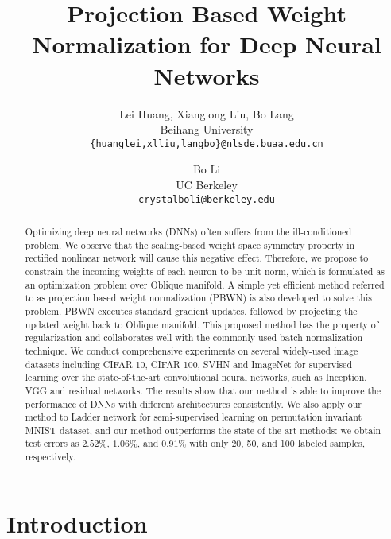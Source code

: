 \documentclass[twocolumn]{article}
\newcommand{\TODO}[1]{\textcolor{red}{TODO: }\textcolor{red}{\emph{#1}}}
\begin{document}
\title{Projection Based Weight Normalization for Deep Neural Networks}

\author{
Lei Huang, Xianglong Liu, Bo Lang\\
Beihang University\\
\texttt{\small\{huanglei,xlliu,langbo\}@nlsde.buaa.edu.cn} \\
\and
Bo Li \\
UC Berkeley\\
\texttt{\small crystalboli@berkeley.edu}
}
\date{}
\maketitle
\begin{abstract}
Optimizing deep neural networks (DNNs) often suffers from  the ill-conditioned problem. We observe that the scaling-based weight space symmetry property in  rectified nonlinear network will cause this negative effect. Therefore, we propose to constrain the incoming weights of each neuron to be unit-norm, which is formulated as an optimization problem over Oblique manifold. A simple yet efficient method referred to as projection based weight normalization (PBWN) is also developed to solve this problem. PBWN executes standard gradient updates, followed by projecting the updated weight back to Oblique manifold.
This proposed method has the property of regularization and collaborates well with the commonly used batch normalization technique.
We conduct comprehensive experiments on several widely-used image datasets including CIFAR-10, CIFAR-100, SVHN and ImageNet for supervised learning over the state-of-the-art convolutional neural networks, such as  Inception, VGG  and residual networks. The results show that our method is able to improve the performance of DNNs with different architectures consistently. We also apply our method to Ladder network for  semi-supervised learning on permutation invariant MNIST dataset, and our method outperforms the state-of-the-art methods: we obtain test errors as $2.52\%$, $1.06\%$, and $0.91\%$ with only 20, 50, and 100 labeled samples, respectively.
\end{abstract}

\section{Introduction}
\label{sec_intro}
\end{document}
